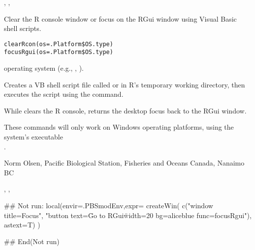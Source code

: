 \documentclass[letterpaper]{book}
\begin{document}
%
\begin{SeeAlso}\relax
{}, , 
\end{SeeAlso}
%
\begin{Description}\relax
Clear the R console window or focus on the RGui window using Visual Basic shell scripts.
\end{Description}
%
\begin{Usage}
\begin{verbatim}
clearRcon(os=.Platform$OS.type)
focusRgui(os=.Platform$OS.type)
\end{verbatim}
\end{Usage}
%
\begin{Arguments}
\begin{ldescription}
\item[\code{os}] operating system (e.g., , ). 
\end{ldescription}
\end{Arguments}
%
\begin{Details}\relax
Creates a VB shell script file called  or 
in R's temporary working directory, then executes the script using the  command.

While  clears the R console,  returns the desktop 
focus back to the RGui window.

These commands will only work on Windows operating platforms, using the system's executable \\{}
.
\end{Details}
%
\begin{Author}\relax
Norm Olsen, Pacific Biological Station, Fisheries and Oceans Canada, Nanaimo BC
\end{Author}
%
\begin{SeeAlso}\relax
{}, ,  
\end{SeeAlso}
%
\begin{Examples}
\begin{ExampleCode}
## Not run: 
local(envir=.PBSmodEnv,expr={
  createWin( c("window title=Focus",
    "button text=\"Go to RGui\" width=20 bg=aliceblue func=focusRgui"), astext=T)
})

## End(Not run)
\end{ExampleCode}
\end{Examples}
\end{document}
